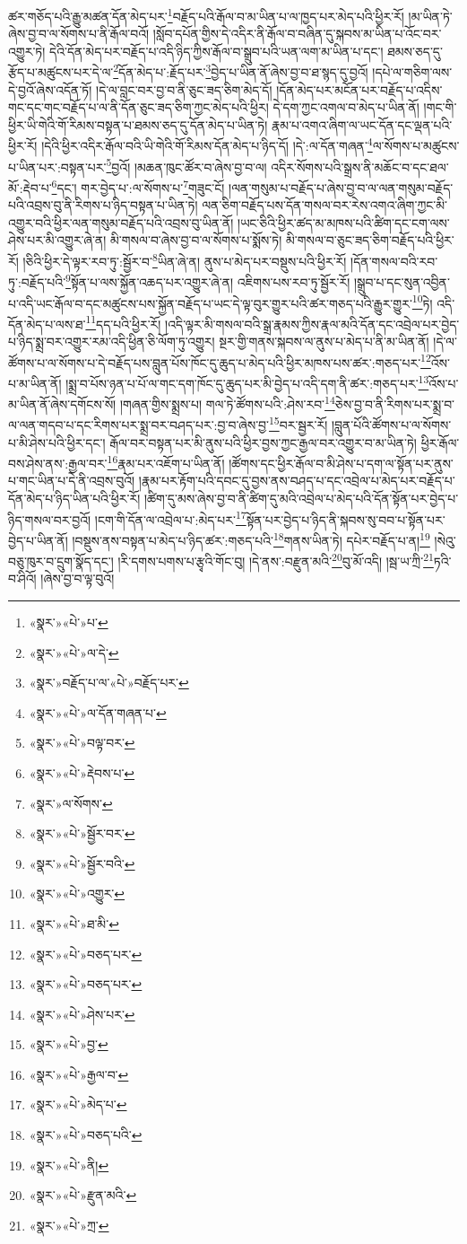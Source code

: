 ཚར་གཅོད་པའི་རྒྱུ་མཚན་དོན་མེད་པར་\footnote{«སྣར་»«པེ་»པ་}བརྗོད་པའི་རྒོལ་བ་མ་ཡིན་པ་ལ་ཁྱད་པར་མེད་པའི་ཕྱིར་རོ། །མ་ཡིན་ཏེ་ཞེས་བྱ་བ་ལ་སོགས་པ་ནི་རྒོལ་བའོ། །སློབ་དཔོན་གྱིས་དེ་འདིར་ནི་རྒོལ་བ་བཞིན་དུ་སྐབས་མ་ཡིན་པ་འོང་བར་འགྱུར་ཏེ། དེའི་དོན་མེད་པར་བརྗོད་པ་འདི་ཉིད་ཀྱིས་རྒོལ་བ་སྒྲུབ་པའི་ཡན་ལག་མ་ཡིན་པ་དང་། ཐམས་ཅད་དུ་རྩོད་པ་མཚུངས་པར་དེ་ལ་\footnote{«སྣར་»«པེ་»ལ་དེ་}དོན་མེད་པ་:རྗོད་པར་\footnote{«སྣར་»བརྗོད་པ་ལ་«པེ་»བརྗོད་པར་}བྱེད་པ་ཡིན་ནོ་ཞེས་བྱ་བ་ཐ་སྙད་དུ་བྱའོ། །དཔེ་ལ་གཅིག་ལས་དེ་བྱའོ་ཞེས་འདོན་ཏོ། །དེ་ལ་བླང་བར་བྱ་བ་ནི་ཅུང་ཟད་ཅིག་མེད་དོ། །དོན་མེད་པར་མངོན་པར་བརྗོད་པ་འདིས་གང་དང་གང་བརྗོད་པ་ལ་ནི་དོན་ཅུང་ཟད་ཅིག་ཀྱང་མེད་པའི་ཕྱིར། དེ་དག་ཀྱང་འགལ་བ་མེད་པ་ཡིན་ནོ། །གང་གི་ཕྱིར་ཡི་གེའི་གོ་རིམས་བསྟན་པ་ཐམས་ཅད་དུ་དོན་མེད་པ་ཡིན་ཏེ། རྣམ་པ་འགའ་ཞིག་ལ་ཡང་དོན་དང་ལྡན་པའི་ཕྱིར་རོ། །དེའི་ཕྱིར་འདིར་རྒོལ་བའི་ཡི་གེའི་གོ་རིམས་དོན་མེད་པ་ཉིད་དོ། །དེ་:ལ་དོན་གཞན་\footnote{«སྣར་»«པེ་»ལ་དོན་གཞན་པ་}ལ་སོགས་པ་མཚུངས་པ་ཡིན་པར་:བསྟན་པར་\footnote{«སྣར་»«པེ་»བལྟ་བར་}བྱའོ། །མཆན་ཁུང་ཚོར་བ་ཞེས་བྱ་བ་ལ། འདིར་སོགས་པའི་སྒྲས་ནི་མཆོང་བ་དང་ཐལ་མོ་:རྡེབ་པ་\footnote{«སྣར་»«པེ་»རྡེབས་པ་}དང་། གར་བྱེད་པ་:ལ་སོགས་པ་\footnote{«སྣར་»ལ་སོགས་}གཟུང་ངོ། །ལན་གསུམ་པ་བརྗོད་པ་ཞེས་བྱ་བ་ལ་ལན་གསུམ་བརྗོད་པའི་འབྲས་བུ་ནི་རིགས་པ་ཉིད་བསྟན་པ་ཡིན་ཏེ། ལན་ཅིག་བརྗོད་པས་དོན་གསལ་བར་རེས་འགའ་ཞིག་ཀྱང་མི་འགྱུར་བའི་ཕྱིར་ལན་གསུམ་བརྗོད་པའི་འབྲས་བུ་ཡིན་ནོ། །ཡང་ཅིའི་ཕྱིར་ཚད་མ་མཁས་པའི་ཚིག་དང་ངག་ལས་ཤེས་པར་མི་འགྱུར་ཞེ་ན། མི་གསལ་བ་ཞེས་བྱ་བ་ལ་སོགས་པ་སྨོས་ཏེ། མི་གསལ་བ་ཅུང་ཟད་ཅིག་བརྗོད་པའི་ཕྱིར་རོ། །ཅིའི་ཕྱིར་དེ་ལྟར་རབ་ཏུ་:སྦྱོར་བ་\footnote{«སྣར་»«པེ་»སྦྱོར་བར་}ཡིན་ཞེ་ན། ནུས་པ་མེད་པར་བསྡུས་པའི་ཕྱིར་རོ། །དོན་གསལ་བའི་རབ་ཏུ་:བརྗོད་པའི་\footnote{«སྣར་»«པེ་»སྦྱོར་བའི་}སྟོན་པ་ལས་སྐྱོན་འཆད་པར་འགྱུར་ཞེ་ན། འཇིགས་པས་རབ་ཏུ་སྦྱོར་རོ། །སྒྲུབ་པ་དང་སུན་འབྱིན་པ་འདི་ཡང་རྒོལ་བ་དང་མཚུངས་པས་སྐྱོན་བརྗོད་པ་ཡང་དེ་ལྟ་བུར་གྱུར་པའི་ཚར་གཅད་པའི་རྒྱུར་གྱུར་\footnote{«སྣར་»«པེ་»འགྱུར་}ཏེ། འདི་དོན་མེད་པ་ལས་ཐ་\footnote{«སྣར་»«པེ་»ཐ་མི་}དད་པའི་ཕྱིར་རོ། །འདི་ལྟར་མི་གསལ་བའི་སྒྲ་རྣམས་ཀྱིས་རྣལ་མའི་དོན་དང་འབྲེལ་པར་བྱེད་པ་ཉིད་སྨྲ་བར་འགྱུར་རམ་འདི་ཕྱིན་ཅི་ལོག་ཏུ་འགྱུར། སྔར་གྱི་གནས་སྐབས་ལ་ནུས་པ་མེད་པ་ནི་མ་ཡིན་ནོ། །དེ་ལ་ཚོགས་པ་ལ་སོགས་པ་དེ་བརྗོད་པས་བླུན་པོས་ཁོང་དུ་ཆུད་པ་མེད་པའི་ཕྱིར་མཁས་པས་ཚར་:གཅད་པར་\footnote{«སྣར་»«པེ་»བཅད་པར་}འོས་པ་མ་ཡིན་ནོ། །སྨྲ་བ་པོས་ཉན་པ་པོ་ལ་གང་དག་ཁོང་དུ་ཆུད་པར་མི་བྱེད་པ་འདི་དག་ནི་ཚར་:གཅད་པར་\footnote{«སྣར་»«པེ་»བཅད་པར་}འོས་པ་མ་ཡིན་ནོ་ཞེས་དགོངས་སོ། །གཞན་གྱིས་སྨྲས་པ། གལ་ཏེ་ཚོགས་པའི་:ཤེས་རབ་\footnote{«སྣར་»«པེ་»ཤེས་པར་}ཅེས་བྱ་བ་ནི་རིགས་པར་སྨྲ་བ་ལ་ལན་གདབ་པ་དང་རིགས་པར་སྨྲ་བར་བཤད་པར་:བྱ་བ་ཞེས་བྱ་\footnote{«སྣར་»«པེ་»བྱ་}བར་སྦྱར་རོ། །བླུན་པོའི་ཚོགས་པ་ལ་སོགས་པ་མི་ཤེས་པའི་ཕྱིར་དང་། རྒོལ་བར་བསྟན་པར་མི་ནུས་པའི་ཕྱིར་བྱས་ཀྱང་རྒྱལ་བར་འགྱུར་བ་མ་ཡིན་ཏེ། ཕྱིར་རྒོལ་བས་ཤེས་ནས་:རྒྱལ་བར་\footnote{«སྣར་»«པེ་»རྒྱལ་བ་}རྣམ་པར་འཇོག་པ་ཡིན་ནོ། །ཚོགས་དང་ཕྱིར་རྒོལ་བ་མི་ཤེས་པ་དག་ལ་སྟོན་པར་ནུས་པ་གང་ཡིན་པ་དེ་ནི་འབྲས་བུའོ། །རྣམ་པར་རྟོག་པའི་དབང་དུ་བྱས་ནས་བཤད་པ་དང་འབྲེལ་པ་མེད་པར་བརྗོད་པ་དོན་མེད་པ་ཉིད་ཡིན་པའི་ཕྱིར་རོ། །ཚིག་དུ་མས་ཞེས་བྱ་བ་ནི་ཚིག་དུ་མའི་འབྲེལ་པ་མེད་པའི་དོན་སྟོན་པར་བྱེད་པ་ཉིད་གསལ་བར་བྱའོ། །ངག་གི་དོན་ལ་འབྲེལ་པ་:མེད་པར་\footnote{«སྣར་»«པེ་»མེད་པ་}སྟོན་པར་བྱེད་པ་ཉིད་ནི་སྐབས་སུ་བབ་པ་སྟོན་པར་བྱེད་པ་ཡིན་ནོ། །བསྡུས་ནས་བསྟན་པ་མེད་པ་ཉིད་ཚར་:གཅད་པའི་\footnote{«སྣར་»«པེ་»བཅད་པའི་}གནས་ཡིན་ཏེ། དཔེར་བརྗོད་པ་ན།\footnote{«སྣར་»«པེ་»ནི།} །སེའུ་བཅུ་ཁུར་བ་དྲུག་སྣོད་དང་། །རི་དགས་པགས་པ་རྩྭའི་གོང་བུ། །དེ་ནས་:བརྫུན་མའི་\footnote{«སྣར་»«པེ་»རྫུན་མའི་}བུ་མོ་འདི། །སྦ་ཡ་ཀྲི་\footnote{«སྣར་»«པེ་»ཀྲ་}ཏའི་བ་ཤིའོ། །ཞེས་བྱ་བ་ལྟ་བུའོ། 